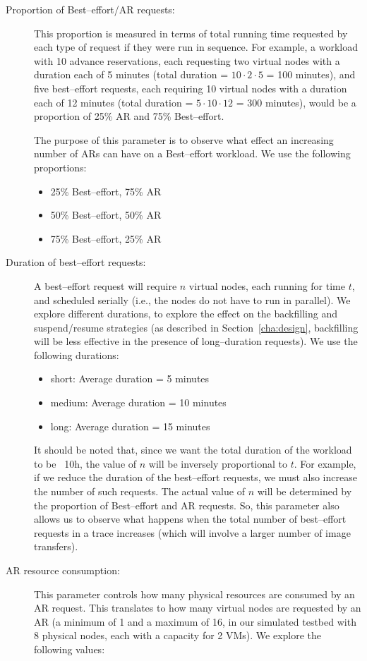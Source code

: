 \begin{description}
\item[Proportion of Best--effort/AR requests:] This proportion is measured in terms of total running time requested by each type of request if they were run in sequence. For example, a workload with 10 advance reservations, each requesting two virtual nodes with a duration each of 5 minutes (total duration = $10\cdot 2\cdot 5$ = 100 minutes), and five best--effort requests, each requiring 10 virtual nodes with a duration each of 12 minutes (total duration = $5\cdot 10\cdot 12$ = 300 minutes), would be a proportion of 25\% AR and 75\% Best--effort. 

The purpose of this parameter is to observe what effect an increasing number of ARs can have on a Best--effort workload. We use the following proportions:
\begin{itemize}
\item 25\% Best--effort, 75\% AR
\item 50\% Best--effort, 50\% AR
\item 75\% Best--effort, 25\% AR
\end{itemize}
\item[Duration of best--effort requests:] A best--effort request will require $n$ virtual nodes, each running for time $t$, and scheduled serially (i.e., the nodes do not have to run in parallel). We explore different durations, to explore the effect on the backfilling and suspend/resume strategies (as described in Section~\ref{cha:design}, backfilling will be less effective in the presence of long--duration requests). We use the following durations:
\begin{itemize}
\item short: Average duration = 5 minutes
\item medium: Average duration = 10 minutes
\item long: Average duration = 15 minutes
\end{itemize}
It should be noted that, since we want the total duration of the workload to be ~10h, the value of $n$ will be inversely proportional to $t$. For example, if we reduce the duration of the best--effort requests, we must also increase the number of such requests. The actual value of $n$ will be determined by the proportion of Best--effort and AR requests. So, this parameter also allows us to observe what happens when the total number of best--effort requests in a trace increases (which will involve a larger number of image transfers).
\item[AR resource consumption:] This parameter controls how many physical resources are consumed by an AR request. This translates to how many virtual nodes are requested by an AR (a minimum of 1 and a maximum of 16, in our simulated testbed with 8 physical nodes, each with a capacity for 2 VMs). We explore the following values:

\end{description}
